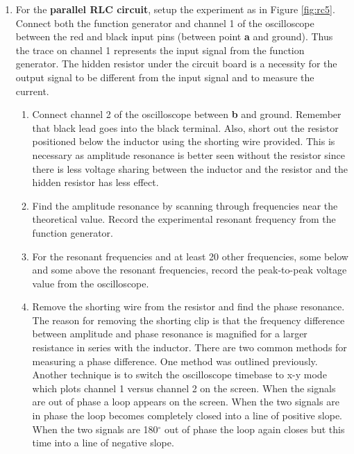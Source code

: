 \begin{enumerate}
\item For the {\bf parallel RLC circuit}, setup the experiment as in Figure \ref{fig:rc5}. Connect both the function generator and channel 1 of the oscilloscope between the red and black input pins (between point {\bf a} and ground). Thus the trace on channel 1 represents the input signal from the function generator. The hidden resistor under the circuit board is a necessity for the output signal to be different from the input signal and to measure the current.

\begin{enumerate}[label=\alph*)]

\item Connect channel 2 of the oscilloscope between {\bf b} and ground. Remember that black lead goes into the black terminal. Also, short out the resistor positioned below the inductor using the shorting wire provided. This is necessary as amplitude resonance is better seen without the resistor since there is less voltage sharing between the inductor and the resistor and the hidden resistor has less effect.

\item Find the amplitude resonance by scanning through frequencies near the theoretical value. Record the experimental resonant frequency from the function generator. 

\item For the resonant frequencies and at least 20 other frequencies, some below and some above the resonant frequencies, record the peak-to-peak voltage value from the oscilloscope.

 \item Remove the shorting wire from the resistor and find the phase resonance. The reason for removing the shorting clip is that the frequency difference between amplitude and phase resonance is magnified for a larger resistance in series with the inductor. There are two common methods for measuring a phase difference. One method was outlined previously. Another technique is to switch the oscilloscope timebase to x-y mode which plots channel 1 versus channel 2 on the screen. When the signals are out of phase a loop appears on the screen. When the two signals are in phase the loop becomes completely closed into a line of positive slope. When the two signals are 180$^{\circ}$ out of phase the loop again closes but this time into a line of negative slope. 

\end{enumerate}
\end{enumerate}

